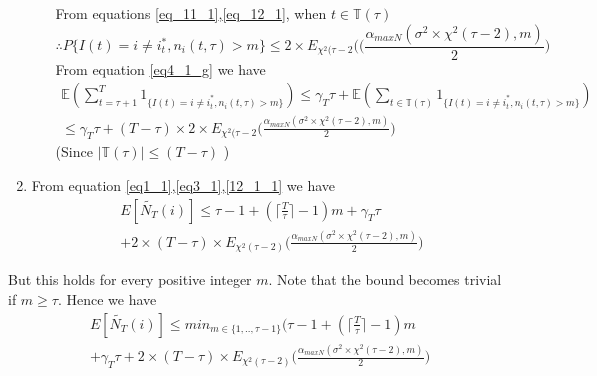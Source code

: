 \documentclass[compress, serif, onlymath, professionalfonts]{beamer}
\begin{document}
\begin{frame}[t,allowframebreaks]
\begin{enumerate}
\begin{itemize}
From equations \ref{eq_11_1},\ref{eq_12_1}, when $t \in \mathbb{T}(\tau)$
\begin{equation}\label{eq13}
\therefore
P\{I(t)=i\neq i^*_t, n_i(t,\tau)> m\} \leq 2 \times E_{\chi^2(\tau-2}(\big(\frac{\alpha_{maxN}(\sigma^2\times\chi^2(\tau-2),m)}{2}\big)
\end{equation}
From equation \ref{eq4_1_g} we have
\begin{multline}
\label{12_1_1}
\mathbb{E}(\sum_{t=\tau+1}^{T}1_{\{I(t)=i\neq i^*_t, n_i(t,\tau)> m\}}) \leq \gamma_T\tau + \mathbb{E}(\sum_{t\in \mathbb{T}(\tau)}1_{\{I(t)=i\neq i^*_t, n_i(t,\tau)> m\}})\\
\leq \gamma_T\tau + (T-\tau)\times 2 \times E_{\chi^2(\tau-2}\big(\frac{\alpha_{maxN}(\sigma^2\times\chi^2(\tau-2),m)}{2}\big)
\end{multline}
(Since $|\mathbb{T(\tau)}|\leq (T-\tau)$ )
\end{itemize}
\item From equation \ref{eq1_1},\ref{eq3_1},\ref{12_1_1} we have \\

\begin{multline}
E[\tilde{N_T}(i)] \leq \tau-1+( \lceil{\frac{T}{\tau}}\rceil-1)m+\gamma_T\tau\\+2\times(T-\tau)\times E_{\chi^2(\tau-2)}\big(\frac{\alpha_{maxN}(\sigma^2\times\chi^2(\tau-2),m)}{2}\big)
\end{multline}

\end{enumerate}
But this holds for every positive integer $m$. Note that the bound becomes trivial if $m \geq \tau$. 
Hence we have
\begin{multline}
E[\tilde{N_T}(i)] \leq min_{m \in \{1,..,\tau-1\}}(\tau-1+( \lceil{\frac{T}{\tau}}\rceil-1)m\\+\gamma_T\tau+2\times(T-\tau)\times E_{\chi^2(\tau-2)}\big(\frac{\alpha_{maxN}(\sigma^2\times\chi^2(\tau-2),m)}{2}\big)
\end{multline}




\end{frame}
\end{document}
